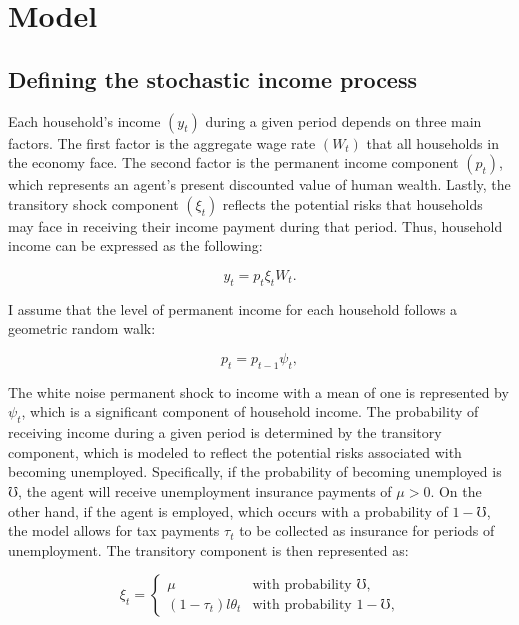 \documentclass[\econtexRoot/Chp1proposal]{subfiles}
\begin{document}
\onlyinsubfile{\setcounter{section}{2}}
\section{Model}
\notinsubfile{\label{sec:Model}}

\subsection{Defining the stochastic income process}

\par Each household's income $(y_t)$ during a given period depends on three main factors. The first factor is the aggregate wage rate $(W_t)$ that all households in the economy face. The second factor is the permanent income component $(p_t)$, which represents an agent's present discounted value of human wealth. Lastly, the transitory shock component $(\xi_t)$ reflects the potential risks that households may face in receiving their income payment during that period. Thus, household income can be expressed as the following:

$$ y_t = p_t \xi_t W_t . $$


\par I assume that the level of permanent income for each household follows a geometric random walk:

$$ p_t = p_{t-1} \psi_{t}, $$

\par The white noise permanent shock to income with a mean of one is represented by $\psi_t$, which is a significant component of household income. The probability of receiving income during a given period is determined by the transitory component, which is modeled to reflect the potential risks associated with becoming unemployed. Specifically, if the probability of becoming unemployed is $\mho$, the agent will receive unemployment insurance payments of $\mu > 0$. On the other hand, if the agent is employed, which occurs with a probability of $1 - \mho$, the model allows for tax payments $\tau_t$ to be collected as insurance for periods of unemployment. The transitory component is then represented as:

\begin{equation*}
\xi_t =
    \begin{cases}
        \mu & \text{with probability $\mho$,} \\
        (1-\tau_t) l \theta_t & \text{with probability $1-\mho$,}
    \end{cases}
\end{equation*}
\end{document}
